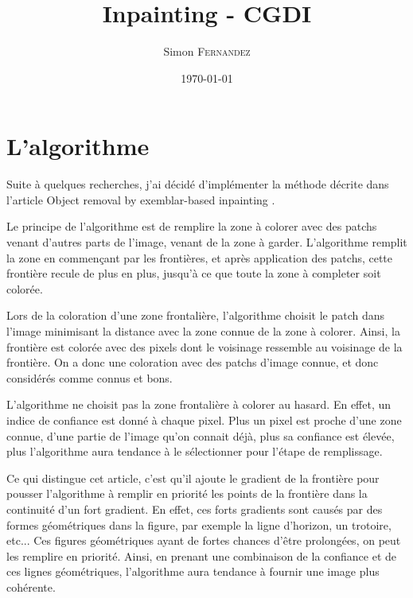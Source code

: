 

\title{Inpainting - CGDI}

\author{Simon \textsc{Fernandez}}
\date{\today}


\maketitle

\section{L'algorithme}
Suite à quelques recherches, j'ai décidé d'implémenter la méthode 
décrite dans l'article Object removal by exemblar-based inpainting
\cite{article}.

Le principe de l'algorithme est de remplire la zone à colorer avec des 
patchs venant d'autres parts de l'image, venant de la zone à garder.
L'algorithme remplit la zone en commençant par les frontières, et après
application des patchs, cette frontière recule de plus en plus, jusqu'à 
ce que toute la zone à completer soit colorée. 

Lors de la coloration d'une zone frontalière, l'algorithme choisit le 
patch dans l'image minimisant la distance avec la zone connue de la zone
à colorer. Ainsi, la frontière est colorée avec des pixels dont le voisinage
ressemble au voisinage de la frontière. On a donc une coloration avec 
des patchs d'image connue, et donc considérés comme connus et bons.

L'algorithme ne choisit pas la zone frontalière à colorer au hasard. En 
effet, un indice de confiance est donné à chaque pixel. Plus un pixel 
est proche d'une zone connue, d'une partie de l'image qu'on connait déjà,
plus sa confiance est élevée, plus l'algorithme aura tendance à le 
sélectionner pour l'étape de remplissage. 

Ce qui distingue cet article\cite{article}, c'est qu'il ajoute le gradient
de la frontière pour pousser l'algorithme à remplir en priorité les 
points de la frontière dans la continuité d'un fort gradient. En effet,
ces forts gradients sont causés par des formes géométriques dans la figure,
par exemple la ligne d'horizon, un trotoire, etc...
Ces figures géométriques ayant de fortes chances d'être prolongées, on peut
les remplire en priorité. Ainsi, en prenant une combinaison de la confiance
et de ces lignes géométriques, l'algorithme aura tendance à fournir une 
image plus cohérente.

